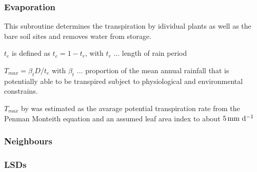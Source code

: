\subsubsection{Evaporation}

This subroutine determines the transpiration by idividual plants as well as the bare soil sites and removes water from storage. 


\begin{usessubs}
\end{usessubs}

$t_e$ is defined as $t_e = 1-t_r$, with $t_r$ ... length of rain period

$T_{max} = \beta_t D/t_e$ with $\beta_t$ ... proportion of the mean annual rainfall that is potentially able to be transpired subject to physiological and environmental constrains. 

$T_{max}$ by \citet{gav2012} was estimated as the avarage potential transpiration rate from the Penman Monteith equation and an assumed leaf area index to about $\unit[5]{mm\ d^{-1}}$

\subsubsection{Neighbours}



\subsubsection{LSDs}

